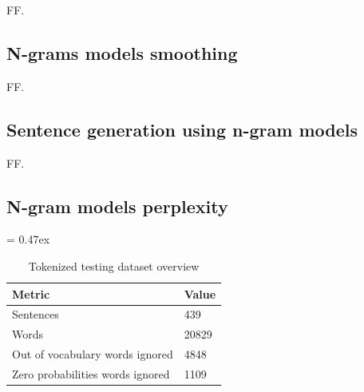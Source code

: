 FF.



\subsection{N-grams models smoothing}

FF.



\subsection{Sentence generation using n-gram models}

FF.



\subsection{N-gram models perplexity}

\begin{table}[t]
	\caption{Tokenized testing dataset overview}
	\extrarowsep = 0.47ex
	\centering
	\begin{tabu} to 0.33\textwidth { X[5,l,m] X[r,m] }
		\rowfont{\bfseries\itshape} Metric & Value \\
		\hline
		Sentences							&	   439	\\
		Words								&	 20829	\\
		Out of vocabulary words ignored		&	  4848	\\
		Zero probabilities words ignored	&	  1109	\\
	\end{tabu}
	\label{tab:n-grams-models-stats}
\end{table}


